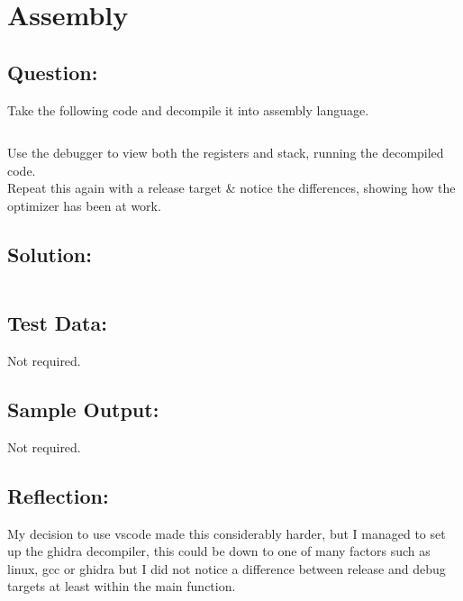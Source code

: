 \documentclass[Lab-B.tex]{subfiles}
\begin{document}
    \section{Assembly}
        \subsection*{Question:}
            Take the following code and decompile it into assembly language.

            \inputminted{cpp}{../Tasks/03-Assembly/Assembly.cpp}

            Use the debugger to view both the registers and stack, 
            running the decompiled code.\\

            Repeat this again with a release target \& notice the differences,
            showing how the optimizer has been at work.

        \subsection*{Solution:}
            {\renewcommand\fcolorbox[4][]{\textcolor{cyan}{\strut#4}}
                \inputminted{gas}{../Tasks/03-Assembly/Assembly.txt}%
            }
        \subsection*{Test Data:}
            Not required.
        
        \subsection*{Sample Output:}
            Not required.
        \subsection*{Reflection:}
            My decision to use vscode made this considerably harder, but I managed to set up
            the ghidra decompiler, this could be down to one of many factors such as linux, gcc or ghidra
            but I did not notice a difference between release and debug targets at least within the main function.
\end{document}
